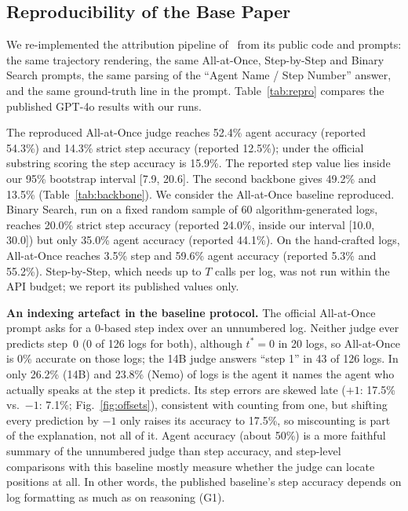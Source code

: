 \documentclass[conference]{IEEEtran}
\begin{document}
\subsection{Reproducibility of the Base Paper}
We re-implemented the attribution pipeline of~\cite{zhang2025whowhen} from its public code and prompts: the same trajectory rendering, the same All-at-Once, Step-by-Step and Binary Search prompts, the same parsing of the ``Agent Name / Step Number'' answer, and the same ground-truth line in the prompt. Table~\ref{tab:repro} compares the published GPT-4o results with our runs.



The reproduced All-at-Once judge reaches 52.4\% agent accuracy (reported 54.3\%) and 14.3\% strict step accuracy (reported 12.5\%); under the official substring scoring the step accuracy is 15.9\%. The reported step value lies inside our 95\% bootstrap interval [7.9, 20.6]. The second backbone gives 49.2\% and 13.5\% (Table~\ref{tab:backbone}). We consider the All-at-Once baseline reproduced. Binary Search, run on a fixed random sample of 60 algorithm-generated logs, reaches 20.0\% strict step accuracy (reported 24.0\%, inside our interval [10.0, 30.0]) but only 35.0\% agent accuracy (reported 44.1\%). On the hand-crafted logs, All-at-Once reaches 3.5\% step and 59.6\% agent accuracy (reported 5.3\% and 55.2\%). Step-by-Step, which needs up to $T$ calls per log, was not run within the API budget; we report its published values only.

\textbf{An indexing artefact in the baseline protocol.} The official All-at-Once prompt asks for a 0-based step index over an unnumbered log. Neither judge ever predicts step~0 (0 of 126 logs for both), although $t^*=0$ in 20 logs, so All-at-Once is 0\% accurate on those logs; the 14B judge answers ``step 1'' in 43 of 126 logs. In only 26.2\% (14B) and 23.8\% (Nemo) of logs is the agent it names the agent who actually speaks at the step it predicts. Its step errors are skewed late ($+1$: 17.5\% vs.\ $-1$: 7.1\%; Fig.~\ref{fig:offsets}), consistent with counting from one, but shifting every prediction by $-1$ only raises its accuracy to 17.5\%, so miscounting is part of the explanation, not all of it. Agent accuracy (about 50\%) is a more faithful summary of the unnumbered judge than step accuracy, and step-level comparisons with this baseline mostly measure whether the judge can locate positions at all. In other words, the published baseline's step accuracy depends on log formatting as much as on reasoning (G1).
\end{document}
